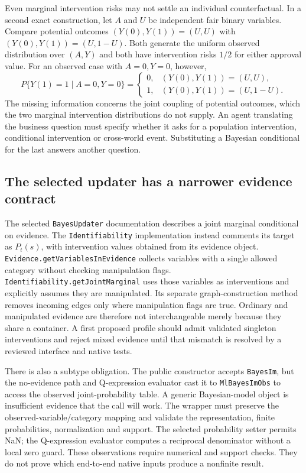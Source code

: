 Even marginal intervention risks may not settle an individual counterfactual.
In a second exact construction, let $A$ and $U$ be independent fair binary
variables. Compare potential outcomes $(Y(0),Y(1))=(U,U)$ with
$(Y(0),Y(1))=(U,1-U)$. Both generate the uniform observed distribution over
$(A,Y)$ and both have intervention risks $1/2$ for either approval value. For
an observed case with $A=0,Y=0$, however,
\begin{equation}
 P\{Y(1)=1\mid A=0,Y=0\}=
 \begin{cases}0,&(Y(0),Y(1))=(U,U),\\
 1,&(Y(0),Y(1))=(U,1-U).
 \end{cases}
 \label{exec19:javaid-coupling}
\end{equation}
The missing information concerns the joint coupling of potential outcomes,
which the two marginal intervention distributions do not supply. An agent
translating the business question must specify whether it asks for a population
intervention, conditional intervention or cross-world event. Substituting a
Bayesian conditional for the last answers another question.
\citep{exec19_javaid_reference}

\subsection{The selected updater has a narrower evidence contract}
\label{exec19:javaid-evidence}

The selected \texttt{BayesUpdater} documentation describes a joint marginal
conditional on evidence. The \texttt{Identifiability} implementation instead
comments its target as $P_t(s)$, with intervention values obtained from its
evidence object. \texttt{Evidence.getVariablesInEvidence} collects variables
with a single allowed category without checking manipulation flags.
\texttt{Identifiability.getJointMarginal} uses those variables as interventions
and explicitly assumes they are manipulated. Its separate graph-construction
method removes incoming edges only where manipulation flags are true.
Ordinary and manipulated evidence are therefore not interchangeable merely
because they share a container. A first proposed profile should admit validated
singleton interventions and reject mixed evidence until that mismatch is
resolved by a reviewed interface and native tests.\citep{exec19_javaid_source}

There is also a subtype obligation. The public constructor accepts
\texttt{BayesIm}, but the no-evidence path and Q-expression evaluator cast it
to \texttt{MlBayesImObs} to access the observed joint-probability table. A
generic Bayesian-model object is insufficient evidence that the call will work.
The wrapper must preserve the observed-variable/category mapping and validate
the representation, finite probabilities, normalization and support. The
selected probability setter permits NaN; the Q-expression evaluator computes
a reciprocal denominator without a local zero guard. These observations
require numerical and support checks. They do not prove which end-to-end
native inputs produce a nonfinite result.\citep{exec19_javaid_source}

